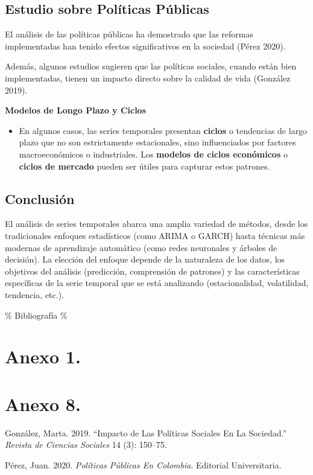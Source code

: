 \subsection{Estudio sobre Políticas
Públicas}\label{estudio-sobre-poluxedticas-puxfablicas}

El análisis de las políticas públicas ha demostrado que las reformas
implementadas han tenido efectos significativos en la sociedad (Pérez
2020).

Además, algunos estudios sugieren que las políticas sociales, cuando
están bien implementadas, tienen un impacto directo sobre la calidad de
vida (González 2019).

\textbf{Modelos de Longo Plazo y Ciclos}

\begin{itemize}
\tightlist
\item
  En algunos casos, las series temporales presentan \textbf{ciclos} o
  tendencias de largo plazo que no son estrictamente estacionales, sino
  influenciados por factores macroeconómicos o industriales. Los
  \textbf{modelos de ciclos económicos} o \textbf{ciclos de mercado}
  pueden ser útiles para capturar estos patrones.
\end{itemize}

\subsection{Conclusión}\label{conclusiuxf3n}

El análisis de series temporales abarca una amplia variedad de métodos,
desde los tradicionales enfoques estadísticos (como ARIMA o GARCH) hasta
técnicas más modernas de aprendizaje automático (como redes neuronales y
árboles de decisión). La elección del enfoque depende de la naturaleza
de los datos, los objetivos del análisis (predicción, comprensión de
patrones) y las características específicas de la serie temporal que se
está analizando (estacionalidad, volatilidad, tendencia, etc.).

\% Bibliografía \% \nocite{*}

\section{Anexo 1.}\label{anexo-1.}

\section*{Anexo 8.}\label{anexo-8.}

\label{refs}
\begin{CSLReferences}{1}{0}
González, Marta. 2019. {``Impacto de Las Políticas Sociales En La
Sociedad.''} \emph{Revista de Ciencias Sociales} 14 (3): 150--75.

Pérez, Juan. 2020. \emph{Políticas Públicas En Colombia}. Editorial
Universitaria.

\end{CSLReferences}
